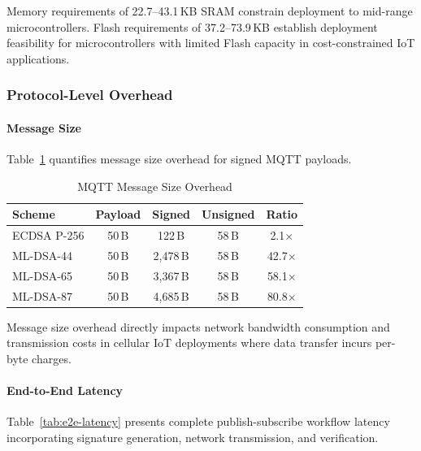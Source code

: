 \documentclass[final, twoside]{IEEEtran} %
\begin{document}
Memory requirements of 22.7--43.1\,KB SRAM constrain deployment to mid-range microcontrollers. Flash requirements of 37.2--73.9\,KB establish deployment feasibility for microcontrollers with limited Flash capacity in cost-constrained IoT applications.

\subsubsection{Protocol-Level Overhead}

\paragraph{Message Size}

Table~\ref{tab:message-overhead} quantifies message size overhead for signed MQTT payloads.

\begin{table}[h]
	\centering
	\caption{MQTT Message Size Overhead}
	\label{tab:message-overhead}
	\begin{tabular}{lcccc}
		\toprule
		\textbf{Scheme} & \textbf{Payload} & \textbf{Signed} & \textbf{Unsigned} & \textbf{Ratio} \\
		\midrule
		ECDSA P-256     & 50\,B            & 122\,B          & 58\,B             & 2.1$\times$    \\
		ML-DSA-44       & 50\,B            & 2,478\,B        & 58\,B             & 42.7$\times$   \\
		ML-DSA-65       & 50\,B            & 3,367\,B        & 58\,B             & 58.1$\times$   \\
		ML-DSA-87       & 50\,B            & 4,685\,B        & 58\,B             & 80.8$\times$   \\
		\bottomrule
	\end{tabular}
\end{table}

Message size overhead directly impacts network bandwidth consumption and transmission costs in cellular IoT deployments where data transfer incurs per-byte charges.

\paragraph{End-to-End Latency}

Table~\ref{tab:e2e-latency} presents complete publish-subscribe workflow latency incorporating signature generation, network transmission, and verification.
\end{document}

